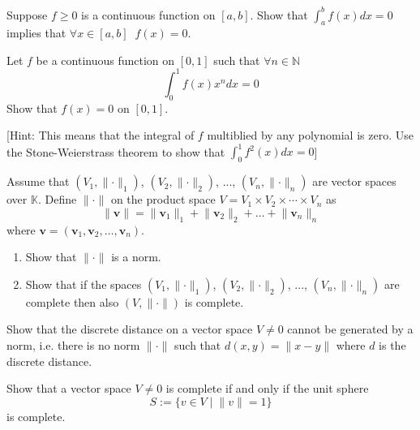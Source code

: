 \documentclass[11pt]{article}%
\begin{document}
\begin{Exercise}[title={*}]
	Suppose $f\geq0$ is a continuous function on $[a,b]$. Show that $\int_a^b f(x)dx=0$ implies that $\forall x\in[a,b]\;\;f(x)=0$.
	
\end{Exercise}


\bigskip

\begin{Exercise}[title={**}]
	Let $f$ be a continuous function on $[0,1]$ such that $\forall n\in \mathbb{N}$
	$$\int_0^1 f(x) x^n dx =0$$
	Show that $f(x)=0$ on $[0,1]$.
	
	\bigskip
	
	[Hint: This means that the integral of $f$ multiblied by any polynomial is zero. Use the Stone-Weierstrass theorem to show that $\int_0^1 f^2(x)dx=0$]
\end{Exercise}

\begin{Exercise}[title={*}]
	Assume that $(V_1,\lVert\cdot\rVert_1)$, $(V_2,\lVert\cdot\rVert_2)$, ..., $(V_n,\lVert\cdot\rVert_n)$ are vector spaces over $\mathbb K$. Define $\lVert\cdot\rVert$ on the product space $V = V_1\times V_2\times\cdots\times V_n$ as
	\[\lVert\textbf{v}\rVert = \lVert\textbf{v}_1\rVert_1+\lVert\textbf{v}_2\rVert_2+\dots + \lVert\textbf{v}_n\rVert_n\] 
	where $\textbf{v} = (\textbf{v}_1, \textbf{v}_2, \dots, \textbf{v}_n)$.
	\begin{enumerate}
		\item Show that $\lVert\cdot\rVert$ is a norm.
		\item Show that if the spaces $(V_1,\lVert\cdot\rVert_1)$, $(V_2,\lVert\cdot\rVert_2)$, ..., $(V_n,\lVert\cdot\rVert_n)$ are complete then also $(V,\lVert\cdot\rVert)$ is complete.
	\end{enumerate}
	
\end{Exercise}

\begin{Exercise}[title={**}]
	Show that the discrete distance on a vector space $V\neq {0}$ cannot be generated by a norm, i.e. there is no norm $\lVert\cdot\rVert$ such that $d(x,y) = \lVert x-y \rVert$ where $d$ is the discrete distance.
\end{Exercise}

\begin{Exercise}[title={**}]
	Show that a vector space $V\neq {0}$ is complete if and only if the unit sphere \[S:=\{v\in V \;|\; \lVert v\rVert =1\}\]
	is complete.
\end{Exercise}
\end{document}
